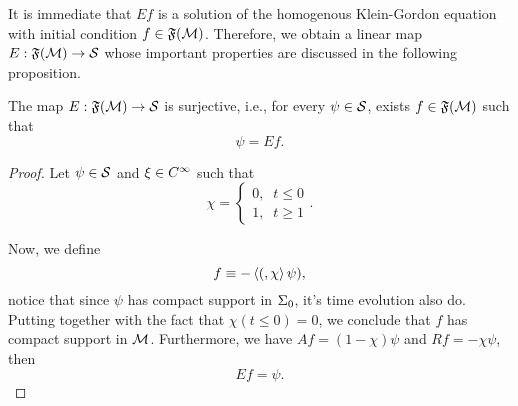 It is immediate that \(Ef\) is a solution of the homogenous Klein-Gordon equation with initial condition \(f\in{\mathfrak{F}}({\mathcal{M}})\). Therefore, we obtain a linear map \(E:{\mathfrak{F}}({\mathcal{M}})\to{\mathcal{S}}\) whose important properties are discussed in the following proposition.
\begin{proposition}\label{prop:E1}
    The map \(E:{\mathfrak{F}}({\mathcal{M}})\to{\mathcal{S}}\) is surjective, i.e., for every \(\psi\in{\mathcal{S}}\), exists \(f\in{\mathfrak{F}}({\mathcal{M}})\) such that
    \begin{equation}
        \psi=Ef.
    \end{equation}
\end{proposition}
\begin{proof}
    Let \(\psi\in{\mathcal{S}}\) and \(\xi\in C^{\infty}\) such that
    \begin{equation}
        \chi=
        \begin{cases}
            0,\;\;t\leq 0\\
            1,\;\;t\geq 1
        \end{cases}.
    \end{equation}

    Now, we define
    \begin{equation}
        f\equiv-\left\langle (, \chi\right\rangle\psi),
    \end{equation}
    notice that since \(\psi\) has compact support in \(\Sigma_0\), it's time evolution also do. Putting together with the fact that \(\chi\left(t\leq 0\right)=0\), we conclude that \(f\) has compact support in \({\mathcal{M}}\). Furthermore, we have \(Af=(1-\chi)\psi\) and \(Rf=-\chi\psi\), then
    \begin{equation}
        Ef=\psi.
    \end{equation}
\end{proof}

